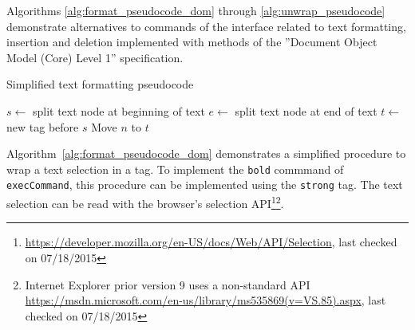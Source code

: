 Algorithms \ref{alg:format_pseudocode_dom} through \ref{alg:unwrap_pseudocode} demonstrate alternatives to commands of the  interface related to text formatting, insertion and deletion implemented with methods of the ''Document Object Model (Core) Level 1'' specification.


\begin{algorithm}
\caption{Simplified text formatting pseudocode}
\label{alg:format_pseudocode_dom}
\begin{algorithmic}[1]
\State $s \gets$ split text node at beginning of text
\State $e \gets$ split text node at end of text
\State $t \gets$ new tag before $s$
  \State Move $n$ to $t$
\EndFor
\EndProcedure
\end{algorithmic}
\end{algorithm}



Algorithm~\ref{alg:format_pseudocode_dom} demonstrates a simplified procedure to wrap a text selection in a tag. To implement the \texttt{bold} commmand of \texttt{execCommand}, this procedure can be implemented using the \texttt{strong} tag. The text selection can be read with the browser's selection API\footnote{\url{https://developer.mozilla.org/en-US/docs/Web/API/Selection}, last checked on 07/18/2015}\footnote{Internet Explorer prior version 9 uses a non-standard API \url{https://msdn.microsoft.com/en-us/library/ms535869(v=VS.85).aspx}, last checked on 07/18/2015}.



